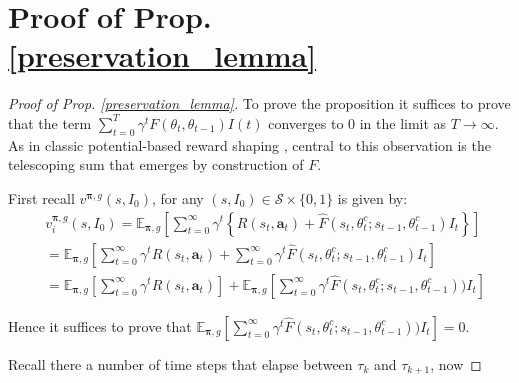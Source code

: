\documentclass{article}
\begin{document}
\section*{Proof of Prop. \ref{preservation_lemma}}
\begin{proof}[Proof of Prop. \ref{preservation_lemma}]
To prove the proposition it suffices to prove that the term $\sum_{t=0}^T\gamma^{t}F(\theta_t,\theta_{t-1})I(t)$ converges to $0$ in the limit as $T\to \infty$. As in classic potential-based reward shaping \cite{ng1999policy}, central to this observation is the telescoping sum that emerges by construction of $F$.

First recall $v^{\boldsymbol{\pi},g}(s,I_0)$, for any $(s,I_0)\in\mathcal{S}\times\{0,1\}$ is given by:
\begin{align}
&v^{\boldsymbol{\pi},g}_i(s,I_0)=\mathbb{E}_{\boldsymbol{\pi},g}\left[\sum_{t=0}^\infty \gamma^t\left\{R(s_t,\boldsymbol{a}_t)+\hat{F}(s_t,\theta^c_t;s_{t-1},\theta^c_{t-1})I_t\right\}\right]
\\&=\mathbb{E}_{\boldsymbol{\pi},g}\left[\sum_{t=0}^\infty \gamma^tR(s_t,\boldsymbol{a}_t)+\sum_{t=0}^\infty \gamma^t\hat{F}(s_t,\theta^c_t;s_{t-1},\theta^c_{t-1})I_t\right]
\\&=\mathbb{E}_{\boldsymbol{\pi},g}\left[\sum_{t=0}^\infty \gamma^tR(s_t,\boldsymbol{a}_t)\right]+\mathbb{E}_{\boldsymbol{\pi},g}\left[\sum_{t=0}^\infty \gamma^t\hat{F}(s_t,\theta^c_t;s_{t-1},\theta^c_{t-1}))I_t\right]
\end{align}

Hence it suffices to prove that $\mathbb{E}_{\boldsymbol{\pi},g}\left[\sum_{t=0}^\infty \gamma^t\hat{F}(s_t,\theta^c_t;s_{t-1},\theta^c_{t-1}))I_t\right]=0$.

Recall there a number of time steps that elapse between $\tau_k$ and $\tau_{k+1}$, now
  

\end{proof}
\end{document}
